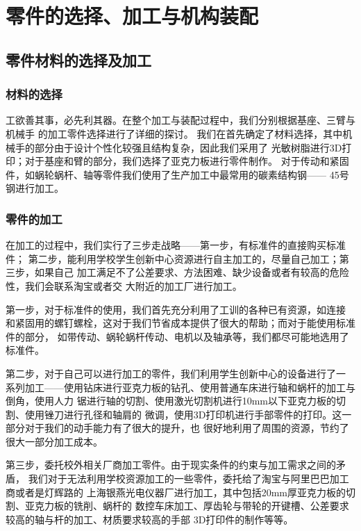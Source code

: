 
\chapter{零件的选择、加工与机构装配}

\section{零件材料的选择及加工}

\subsection{材料的选择}

{\songti 工欲善其事，必先利其器。在整个加工与装配过程中，我们分别根据基座、三臂与机械手
的加工零件选择进行了详细的探讨。
我们在首先确定了材料选择，其中机械手的部分由于设计个性化较强且结构复杂，因此我们采用了
光敏树脂进行3D打印；对于基座和臂的部分，我们选择了亚克力板进行零件制作。
对于传动和紧固件，如蜗轮蜗杆、轴等零件我们使用了生产加工中最常用的碳素结构钢——
45号钢进行加工。}

\subsection{零件的加工}

{\songti 在加工的过程中，我们实行了三步走战略——第一步，有标准件的直接购买标准件；
第二步，能利用学校学生创新中心资源进行自主加工的，尽量自己加工；第三步，如果自己
加工满足不了公差要求、方法困难、缺少设备或者有较高的危险性，我们会联系淘宝或者交
大附近的加工厂进行加工。}

{\songti 第一步，对于标准件的使用，我们首先充分利用了工训的各种已有资源，如连接
和紧固用的螺钉螺栓，这对于我们节省成本提供了很大的帮助；而对于能使用标准件的部分，
如带传动、蜗轮蜗杆传动、电机以及轴承等，我们都尽可能地选用了标准件。}

{\songti 第二步，对于自己可以进行加工的零件，我们利用学生创新中心的设备进行了一
系列加工——使用钻床进行亚克力板的钻孔、使用普通车床进行轴和蜗杆的加工与倒角，使用人力
锯进行轴的切割、使用激光切割机进行10mm以下亚克力板的切割、使用锉刀进行孔径和轴肩的
微调，使用3D打印机进行手部零件的打印。这一部分对于我们的动手能力有了很大的提升，也
很好地利用了周围的资源，节约了很大一部分加工成本。}

{\songti 第三步，委托校外相关厂商加工零件。由于现实条件的约束与加工需求之间的矛盾，
我们对于无法利用学校资源加工的一些零件，委托给了淘宝与阿里巴巴加工商或者是灯辉路的
上海银燕光电仪器厂进行加工，其中包括20mm厚亚克力板的切割、亚克力板的铣削、蜗杆的
数控车床加工、厚齿轮与带轮的开键槽、公差要求较高的轴与杆的加工、材质要求较高的手部
3D打印件的制作等等。}


